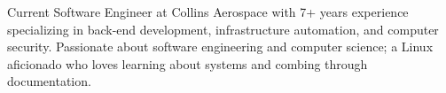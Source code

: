 

\begin{cvparagraph}

Current Software Engineer at Collins Aerospace with 7+ years experience specializing in back-end development, infrastructure automation, and computer security. Passionate about software engineering and computer science; a Linux aficionado who loves learning about systems and combing through documentation. 
\end{cvparagraph}
